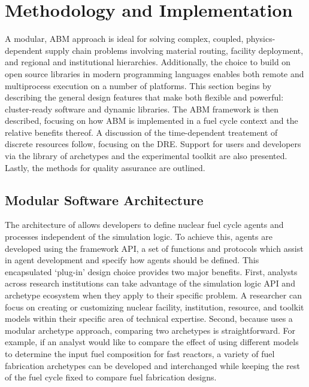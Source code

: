\section{Methodology and Implementation}

A modular, \acrfull{ABM} approach is ideal for solving complex, coupled,
physics-dependent supply chain problems involving material routing, facility
deployment, and regional and institutional hierarchies. Additionally, the choice
to build \Cyclus on open source libraries in modern programming languages
enables both remote and multiprocess execution on a number of platforms. This
section begins by describing the general design features that make \Cyclus both
flexible and powerful: cluster-ready software and dynamic libraries.  The
\gls{ABM} framework is then described, focusing on how \gls{ABM} is implemented
in a fuel cycle context and the relative benefits thereof. A discussion of the
time-dependent treatement of discrete resources follow, focusing on the
\gls{DRE}. Support for users and developers via the \Cycamore library of
archetypes and the experimental toolkit are also presented.  Lastly, the methods
for quality assurance are outlined.

\subsection{Modular Software Architecture}

The architecture of \Cyclus allows developers to define nuclear fuel cycle
agents and processes independent of the simulation logic. To achieve this,
agents are developed using the \Cyclus framework \gls{API}, a set of functions
and protocols which assist in agent development and specify how agents should be
defined.  This encapsulated `plug-in' design choice provides two major
benefits. First, analysts across research institutions can take advantage of the
simulation logic \gls{API} and archetype ecosystem when they apply \Cyclus to
their specific problem.  A researcher can focus on creating or customizing
nuclear facility, institution, resource, and toolkit models within their
specific area of technical expertise. Second, because \Cyclus uses a modular
archetype approach, comparing two archetypes is straightforward. For example, if
an analyst would like to compare the effect of using different models to
determine the input fuel composition for fast reactors, a variety of fuel
fabrication archetypes can be developed and interchanged while keeping the rest
of the fuel cycle fixed to compare fuel fabrication designs.

